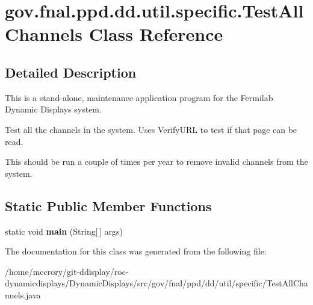 \hypertarget{classgov_1_1fnal_1_1ppd_1_1dd_1_1util_1_1specific_1_1TestAllChannels}{\section{gov.\-fnal.\-ppd.\-dd.\-util.\-specific.\-Test\-All\-Channels Class Reference}
\label{classgov_1_1fnal_1_1ppd_1_1dd_1_1util_1_1specific_1_1TestAllChannels}
}


\subsection{Detailed Description}
This is a stand-\/alone, maintenance application program for the Fermilab Dynamic Displays system. 

Test all the channels in the system. Uses Verify\-U\-R\-L to test if that page can be read. 

This should be run a couple of times per year to remove invalid channels from the system. \subsection*{Static Public Member Functions}
\begin{DoxyCompactItemize}
\item 
\hypertarget{classgov_1_1fnal_1_1ppd_1_1dd_1_1util_1_1specific_1_1TestAllChannels_a425fb3591c64046af21e8530efcb40dd}{static void {\bfseries main} (String\mbox{[}$\,$\mbox{]} args)}\label{classgov_1_1fnal_1_1ppd_1_1dd_1_1util_1_1specific_1_1TestAllChannels_a425fb3591c64046af21e8530efcb40dd}

\end{DoxyCompactItemize}


The documentation for this class was generated from the following file\-:\begin{DoxyCompactItemize}
\item 
/home/mccrory/git-\/ddisplay/roc-\/dynamicdisplays/\-Dynamic\-Displays/src/gov/fnal/ppd/dd/util/specific/Test\-All\-Channels.\-java\end{DoxyCompactItemize}
